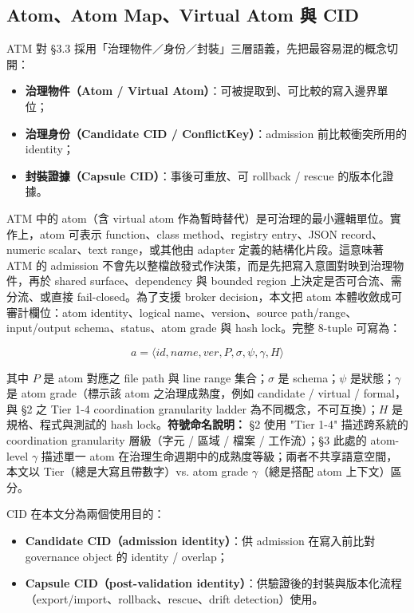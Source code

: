\documentclass[a4paper,fontset=none]{ctexart}
\begin{document}
\subsection{Atom、Atom Map、Virtual Atom 與 CID}

ATM 對 §3.3 採用「治理物件／身份／封裝」三層語義，先把最容易混的概念切開：

\begin{itemize}
\item \textbf{治理物件（Atom / Virtual Atom）}：可被提取到、可比較的寫入邊界單位；
\item \textbf{治理身份（Candidate CID / ConflictKey）}：admission 前比較衝突所用的 identity；
\item \textbf{封裝證據（Capsule CID）}：事後可重放、可 rollback / rescue 的版本化證據。
\end{itemize}

ATM 中的 atom（含 virtual atom 作為暫時替代）是可治理的最小邏輯單位。實作上，atom 可表示 function、class method、registry entry、JSON record、numeric scalar、text range，或其他由 adapter 定義的結構化片段。這意味著 ATM 的 admission 不會先以整檔啟發式作決策，而是先把寫入意圖對映到治理物件，再於 shared surface、dependency 與 bounded region 上決定是否可合流、需分流、或直接 fail-closed。為了支援 broker decision，本文把 atom 本體收斂成可審計欄位：atom identity、logical name、version、source path/range、input/output schema、status、atom grade 與 hash lock。完整 8-tuple 可寫為：

$$a = \langle id, name, ver, P, \sigma, \psi, \gamma, H \rangle$$

其中 $P$ 是 atom 對應之 file path 與 line range 集合；$\sigma$ 是 schema；$\psi$ 是狀態；$\gamma$ 是 atom grade（標示該 atom 之治理成熟度，例如 candidate / virtual / formal，與 §2 之 Tier 1-4 coordination granularity ladder 為不同概念，不可互換）；$H$ 是規格、程式與測試的 hash lock。\textbf{符號命名說明：} §2 使用 "Tier 1-4" 描述跨系統的 coordination granularity 層級（字元 / 區域 / 檔案 / 工作流）；§3 此處的 atom-level $\gamma$ 描述單一 atom 在治理生命週期中的成熟度等級；兩者不共享語意空間，本文以 Tier（總是大寫且帶數字）vs. atom grade $\gamma$（總是搭配 atom 上下文）區分。

CID 在本文分為兩個使用目的：

\begin{itemize}
\item \textbf{Candidate CID（admission identity）}：供 admission 在寫入前比對 governance object 的 identity / overlap；
\item \textbf{Capsule CID（post-validation identity）}：供驗證後的封裝與版本化流程（export/import、rollback、rescue、drift detection）使用。
\end{itemize}
\end{document}

